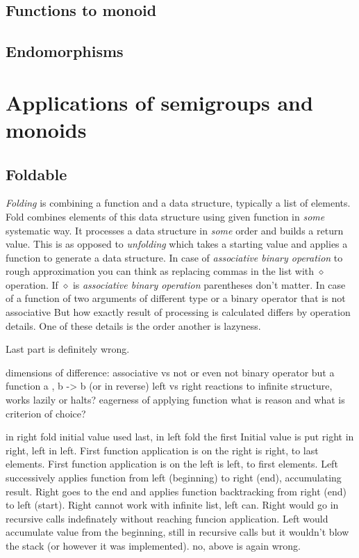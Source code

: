 \documentclass{article}
\begin{document}
    \subsection{Functions to monoid}

    \subsection{Endomorphisms}

    \section{Applications of semigroups and monoids}

    \subsection{Foldable}

    \textit{Folding} is combining a function and a data structure, typically a list of elements. Fold combines elements of this data structure using given function in \textit{some} systematic way. It processes a data structure in \textit{some} order and builds a return value. This is as opposed to \textit{unfolding} which takes a starting value and applies a function to generate a data structure. In case of \textit{associative binary operation} to rough approximation you can think as replacing commas in the list with $\diamond$ operation. If $\diamond$ is \textit{associative binary operation} parentheses don't matter. In case of a function of two arguments of different type or a binary operator that is not associative But how exactly result of processing is calculated differs by operation details. One of these details is the order another is lazyness.

    Last part is definitely wrong.

    dimensions of difference:
        associative vs not
        or even not binary operator but a function a , b -> b (or in reverse)
        left vs right
        reactions to infinite structure, works lazily or halts?
        eagerness of applying function
        what is reason and what is criterion of choice?


        in right fold initial value used last, in left fold the first
        Initial value is put right in right, left in left.
        First function application is on the right is right, to last elements.
        First function application is on the left is left, to first elements.
        Left successively applies function from left (beginning) to right (end), accumulating result.
        Right goes to the end and applies function backtracking from right (end) to left (start).
        Right cannot work with infinite list, left can. Right would go in recursive calls indefinately without reaching funcion application. Left would accumulate value from the beginning, still in recursive calls but it wouldn't blow the stack (or however it was implemented).
        no, above is again wrong.
\end{document}
